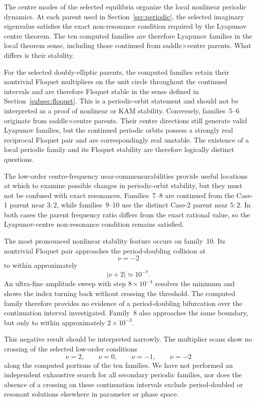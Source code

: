 The centre modes of the selected equilibria organize the local nonlinear
periodic dynamics. At each parent used in Section~\ref{sec:periodic}, the
selected imaginary eigenvalue satisfies the exact non-resonance condition
required by the Lyapunov centre theorem. The ten computed families are
therefore Lyapunov families in the local theorem sense, including those
continued from saddle$\times$centre parents. What differs is their
stability.

For the selected doubly-elliptic parents, the computed families retain
their nontrivial Floquet multipliers on the unit circle throughout the
continued intervals and are therefore Floquet stable in the sense defined
in Section~\ref{subsec:floquet}. This is a periodic-orbit statement and
should not be interpreted as a proof of nonlinear or KAM stability.
Conversely, families~5--6 originate from saddle$\times$centre parents.
Their centre directions still generate valid Lyapunov families, but the
continued periodic orbits possess a strongly real reciprocal Floquet pair
and are correspondingly real unstable. The existence of a local periodic
family and its Floquet stability are therefore logically distinct
questions.

The low-order centre-frequency near-commensurabilities provide useful
locations at which to examine possible changes in periodic-orbit stability,
but they must not be confused with exact resonances. Families~7--8 are
continued from the Case-1 parent near $3{:}2$, while families~9--10 use the
distinct Case-2 parent near $5{:}2$. In both cases the parent frequency
ratio differs from the exact rational value, so the Lyapunov-centre
non-resonance condition remains satisfied.

The most pronounced nonlinear stability feature occurs on family~10. Its
nontrivial Floquet pair approaches the period-doubling collision at
\[
\nu=-2
\]
to within approximately
\[
|\nu+2|\simeq10^{-7}.
\]
An ultra-fine amplitude sweep with step $8\times10^{-4}$ resolves the
minimum and shows the index turning back without crossing the threshold.
The computed family therefore provides no evidence of a period-doubling
bifurcation over the continuation interval investigated. Family~8 also
approaches the same boundary, but only to within approximately
$2\times10^{-3}$.

This negative result should be interpreted narrowly. The multiplier scans
show no crossing of the selected low-order conditions
\[
\nu=2,\qquad
\nu=0,\qquad
\nu=-1,\qquad
\nu=-2
\]
along the computed portions of the ten families. We have not performed an
independent exhaustive search for all secondary periodic families, nor
does the absence of a crossing on these continuation intervals exclude
period-doubled or resonant solutions elsewhere in parameter or phase space.

